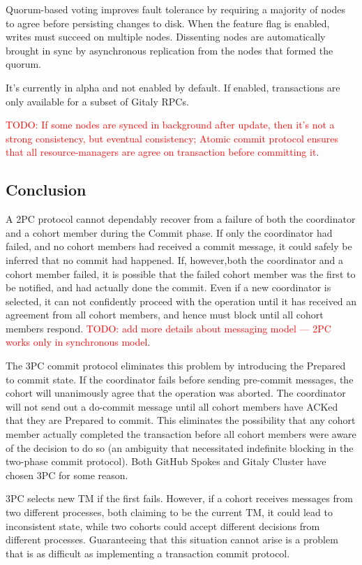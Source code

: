 \documentclass[sigplan, screen, nonacm, 11pt]{acmart}
\newcommand{\todo}[1]{\textcolor{red}{TODO: #1}}
\begin{document}
Quorum-based voting improves fault tolerance by requiring a majority of nodes to agree before persisting changes to disk.
When the feature flag is enabled, writes must succeed on multiple nodes.
Dissenting nodes are automatically brought in sync by asynchronous replication from the nodes that formed the quorum.

It's currently in alpha and not enabled by default.
If enabled, transactions are only available for a subset of Gitaly RPCs.

\todo{If some nodes are synced in background after update, then it's not a strong consistency, but eventual consistency;
Atomic commit protocol ensures that all resource-managers are agree on transaction before committing it}.

\subsection{Conclusion}

A 2PC protocol cannot dependably recover from a failure of both the coordinator and a cohort member during the Commit phase.
If only the coordinator had failed, and no cohort members had received a commit message, it could safely be inferred
that no commit had happened.
If, however,both the coordinator and a cohort member failed, it is possible that the failed cohort member was the first
to be notified, and had actually done the commit.
Even if a new coordinator is selected, it can not confidently proceed with the operation until it has received
an agreement from all cohort members, and hence must block until all cohort members respond.
\todo{add more details about messaging model --- 2PC works only in synchronous model}.

The 3PC commit protocol eliminates this problem by introducing the Prepared to commit state.
If the coordinator fails before sending pre-commit messages, the cohort will unanimously agree that the operation was aborted.
The coordinator will not send out a do-commit message until all cohort members have ACKed that they are Prepared to commit.
This eliminates the possibility that any cohort member actually completed the transaction before all cohort
members were aware of the decision to do so (an ambiguity that necessitated indefinite blocking
in the two-phase commit protocol). Both GitHub Spokes and Gitaly Cluster have chosen 3PC for some reason.

3PC selects new TM if the first fails.
However, if a cohort receives messages from two different processes,
both claiming to be the current TM, it could lead to inconsistent state,
while two cohorts could accept different decisions from different processes.
Guaranteeing that this situation cannot arise is a problem
that is as difficult as implementing a transaction commit protocol.
\end{document}
